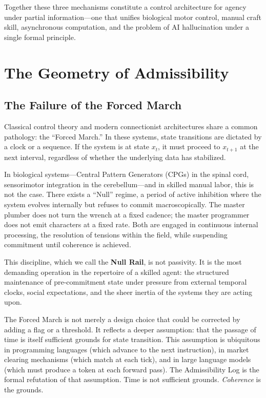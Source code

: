 \documentclass[11pt,oneside]{book}
\begin{document}
Together these three mechanisms constitute a control architecture for agency under partial information---one that unifies biological motor control, manual craft skill, asynchronous computation, and the problem of AI hallucination under a single formal principle.

\chapter{The Geometry of Admissibility}

\section{The Failure of the Forced March}

Classical control theory and modern connectionist architectures share a common pathology: the ``Forced March.'' In these systems, state transitions are dictated by a clock or a sequence. If the system is at state $x_t$, it must proceed to $x_{t+1}$ at the next interval, regardless of whether the underlying data has stabilized.

In biological systems---Central Pattern Generators (CPGs) in the spinal cord, sensorimotor integration in the cerebellum---and in skilled manual labor, this is not the case. There exists a ``Null'' regime, a period of active inhibition where the system evolves internally but refuses to commit macroscopically. The master plumber does not turn the wrench at a fixed cadence; the master programmer does not emit characters at a fixed rate. Both are engaged in continuous internal processing, the resolution of tensions within the field, while suspending commitment until coherence is achieved.

This discipline, which we call the \textbf{Null Rail}, is not passivity. It is the most demanding operation in the repertoire of a skilled agent: the structured maintenance of pre-commitment state under pressure from external temporal clocks, social expectations, and the sheer inertia of the systems they are acting upon.

The Forced March is not merely a design choice that could be corrected by adding a flag or a threshold. It reflects a deeper assumption: that the passage of time is itself sufficient grounds for state transition. This assumption is ubiquitous in programming languages (which advance to the next instruction), in market clearing mechanisms (which match at each tick), and in large language models (which must produce a token at each forward pass). The Admissibility Log is the formal refutation of that assumption. Time is not sufficient grounds. \textit{Coherence} is the grounds.
\end{document}
